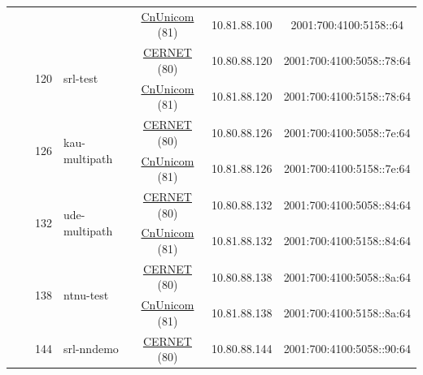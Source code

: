 \begin{small}
\begin{center}
\begin{longtable}{|c|c|c|c|c|c|c|c|}
  &  & \multicolumn{2}{|c|}{} & \multicolumn{2}{|c|}{\tiny{\href{http://www.chinaunicom.com}{CnUnicom} (81)}} & \tiny{10.81.88.100} & \tiny{2001:700:4100:5158::64} \\* \cline{3-3}\cline{4-4}\cline{5-5}\cline{6-6}\cline{7-7}\cline{8-8}
  &  & \multirow{2}{*}{\tiny{120}} & \multicolumn{1}{|l|}{\multirow{2}{*}{\tiny{srl-test}}} & \multicolumn{2}{|c|}{\tiny{\href{http://www.cernet.edu.cn}{CERNET} (80)}} & \tiny{10.80.88.120} & \tiny{2001:700:4100:5058::78:64} \\* \cline{5-5}\cline{6-6}\cline{7-7}\cline{8-8}
  &  &  &  & \multicolumn{2}{|c|}{\tiny{\href{http://www.chinaunicom.com}{CnUnicom} (81)}} & \tiny{10.81.88.120} & \tiny{2001:700:4100:5158::78:64} \\* \cline{3-3}\cline{4-4}\cline{5-5}\cline{6-6}\cline{7-7}\cline{8-8}
  &  & \multirow{2}{*}{\tiny{126}} & \multicolumn{1}{|l|}{\multirow{2}{*}{\tiny{kau-multipath}}} & \multicolumn{2}{|c|}{\tiny{\href{http://www.cernet.edu.cn}{CERNET} (80)}} & \tiny{10.80.88.126} & \tiny{2001:700:4100:5058::7e:64} \\* \cline{5-5}\cline{6-6}\cline{7-7}\cline{8-8}
  &  &  &  & \multicolumn{2}{|c|}{\tiny{\href{http://www.chinaunicom.com}{CnUnicom} (81)}} & \tiny{10.81.88.126} & \tiny{2001:700:4100:5158::7e:64} \\* \cline{3-3}\cline{4-4}\cline{5-5}\cline{6-6}\cline{7-7}\cline{8-8}
  &  & \multirow{2}{*}{\tiny{132}} & \multicolumn{1}{|l|}{\multirow{2}{*}{\tiny{ude-multipath}}} & \multicolumn{2}{|c|}{\tiny{\href{http://www.cernet.edu.cn}{CERNET} (80)}} & \tiny{10.80.88.132} & \tiny{2001:700:4100:5058::84:64} \\* \cline{5-5}\cline{6-6}\cline{7-7}\cline{8-8}
  &  &  &  & \multicolumn{2}{|c|}{\tiny{\href{http://www.chinaunicom.com}{CnUnicom} (81)}} & \tiny{10.81.88.132} & \tiny{2001:700:4100:5158::84:64} \\* \cline{3-3}\cline{4-4}\cline{5-5}\cline{6-6}\cline{7-7}\cline{8-8}
  &  & \multirow{2}{*}{\tiny{138}} & \multicolumn{1}{|l|}{\multirow{2}{*}{\tiny{ntnu-test}}} & \multicolumn{2}{|c|}{\tiny{\href{http://www.cernet.edu.cn}{CERNET} (80)}} & \tiny{10.80.88.138} & \tiny{2001:700:4100:5058::8a:64} \\* \cline{5-5}\cline{6-6}\cline{7-7}\cline{8-8}
  &  &  &  & \multicolumn{2}{|c|}{\tiny{\href{http://www.chinaunicom.com}{CnUnicom} (81)}} & \tiny{10.81.88.138} & \tiny{2001:700:4100:5158::8a:64} \\* \cline{3-3}\cline{4-4}\cline{5-5}\cline{6-6}\cline{7-7}\cline{8-8}
  &  & \multirow{2}{*}{\tiny{144}} & \multicolumn{1}{|l|}{\multirow{2}{*}{\tiny{srl-nndemo}}} & \multicolumn{2}{|c|}{\tiny{\href{http://www.cernet.edu.cn}{CERNET} (80)}} & \tiny{10.80.88.144} & \tiny{2001:700:4100:5058::90:64} \\* \cline{5-5}\cline{6-6}\cline{7-7}\cline{8-8}

\end{longtable}
\end{center}
\end{small}
